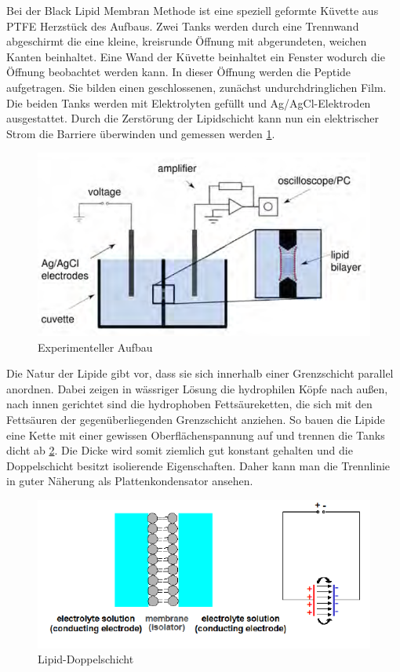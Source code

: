 \documentclass{include/thesisclass3}
\begin{document}
Bei der Black Lipid Membran Methode ist eine speziell geformte Küvette aus PTFE Herzstück des Aufbaus. Zwei Tanks werden durch eine Trennwand abgeschirmt die eine kleine, kreisrunde Öffnung mit abgerundeten, weichen Kanten beinhaltet. Eine Wand der Küvette beinhaltet ein Fenster wodurch die Öffnung beobachtet werden kann. In dieser Öffnung werden die Peptide aufgetragen. Sie bilden einen geschlossenen, zunächst undurchdringlichen Film. Die beiden Tanks werden mit Elektrolyten gefüllt und Ag/AgCl-Elektroden ausgestattet. Durch die Zerstörung der Lipidschicht kann nun ein elektrischer Strom die Barriere überwinden und gemessen werden \ref{aufbau}.\\
\begin{figure}[ht]
	\begin{center}
		\includegraphics{images/experiment.png}
		\caption{Experimenteller Aufbau}
		\label{aufbau}
	\end{center}
\end{figure}
Die Natur der Lipide gibt vor, dass sie sich innerhalb einer Grenzschicht parallel anordnen. Dabei zeigen in wässriger Lösung die hydrophilen Köpfe nach außen, nach innen gerichtet sind die hydrophoben Fettsäureketten, die sich mit den Fettsäuren der gegenüberliegenden Grenzschicht anziehen. So bauen die Lipide eine Kette mit einer gewissen Oberflächenspannung auf und trennen die Tanks dicht ab \ref{double}. Die Dicke wird somit ziemlich gut konstant gehalten und die Doppelschicht besitzt isolierende Eigenschaften. Daher kann man die Trennlinie in guter Näherung als Plattenkondensator ansehen.\\
\begin{figure}[ht]
	\begin{center}
		\includegraphics{images/lipid-doublelayer.png}
		\caption{Lipid-Doppelschicht}
	\label{double}
	\end{center}
\end{figure}
\end{document}
